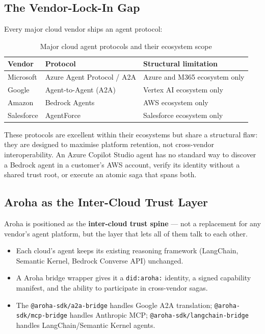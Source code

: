 \documentclass[11pt,a4paper]{article}
\begin{document}
\subsection{The Vendor-Lock-In Gap}

Every major cloud vendor ships an agent protocol:

\begin{table}[ht]
  \centering
  \renewcommand{\arraystretch}{1.4}
  \begin{tabularx}{\textwidth}{@{} l l X @{}}
    \toprule
    \textbf{Vendor} & \textbf{Protocol} & \textbf{Structural limitation} \\
    \midrule
    Microsoft  & Azure Agent Protocol / A2A & Azure and M365 ecosystem only \\
    Google     & Agent-to-Agent (A2A)       & Vertex AI ecosystem only \\
    Amazon     & Bedrock Agents             & AWS ecosystem only \\
    Salesforce & AgentForce                 & Salesforce ecosystem only \\
    \bottomrule
  \end{tabularx}
  \caption{Major cloud agent protocols and their ecosystem scope}
\end{table}

These protocols are excellent within their ecosystems but share a structural
flaw: they are designed to maximise platform retention, not cross-vendor
interoperability. An Azure Copilot Studio agent has no standard way to discover
a Bedrock agent in a customer's AWS account, verify its identity without a
shared trust root, or execute an atomic saga that spans both.

\subsection{Aroha as the Inter-Cloud Trust Layer}

Aroha is positioned as the \textbf{inter-cloud trust spine} --- not a replacement
for any vendor's agent platform, but the layer that lets all of them talk to each
other.

\begin{itemize}[noitemsep]
  \item Each cloud's agent keeps its existing reasoning framework (LangChain,
        Semantic Kernel, Bedrock Converse API) unchanged.
  \item A Aroha bridge wrapper gives it a \texttt{did:aroha:} identity, a signed
        capability manifest, and the ability to participate in cross-vendor sagas.
  \item The \texttt{@aroha-sdk/a2a-bridge} handles Google A2A translation;
        \texttt{@aroha-sdk/mcp-bridge} handles Anthropic MCP;
        \texttt{@aroha-sdk/langchain-bridge} handles LangChain/Semantic Kernel agents.
\end{itemize}
\end{document}
